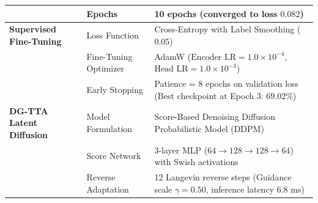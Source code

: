 \begin{table}[t]
\begin{tabular}{lll}
& Epochs & 10 epochs (converged to loss $0.082$) \\
\hline
\textbf{Supervised Fine-Tuning} & Loss Function & Cross-Entropy with Label Smoothing ($0.05$) \\
& Fine-Tuning Optimizer & AdamW ($\text{Encoder LR}=1.0 \times 10^{-4}$, $\text{Head LR}=1.0 \times 10^{-3}$) \\
& Early Stopping & Patience = 8 epochs on validation loss (Best checkpoint at Epoch 3: $69.02\%$) \\
\hline
\textbf{DG-TTA Latent Diffusion} & Model Formulation & Score-Based Denoising Diffusion Probabilistic Model (DDPM) \\
& Score Network & 3-layer MLP ($64 \rightarrow 128 \rightarrow 128 \rightarrow 64$) with Swish activations \\
& Reverse Adaptation & 12 Langevin reverse steps (Guidance scale $\gamma = 0.50$, inference latency $6.8$ ms) \\
\hline
\end{tabular}
\end{table}